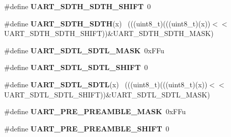 \begin{DoxyCompactItemize}
\item 
\hypertarget{group___u_a_r_t___register___masks_ga144b76c0d393075368118f122cf81fe1}{}\#define {\bfseries U\+A\+R\+T\+\_\+\+S\+D\+T\+H\+\_\+\+S\+D\+T\+H\+\_\+\+S\+H\+I\+F\+T}~0\label{group___u_a_r_t___register___masks_ga144b76c0d393075368118f122cf81fe1}

\item 
\hypertarget{group___u_a_r_t___register___masks_ga3f0c26be4aceb2a72ecb2219b3568dd2}{}\#define {\bfseries U\+A\+R\+T\+\_\+\+S\+D\+T\+H\+\_\+\+S\+D\+T\+H}(x)                                            ~(((uint8\+\_\+t)(((uint8\+\_\+t)(x))$<$$<$U\+A\+R\+T\+\_\+\+S\+D\+T\+H\+\_\+\+S\+D\+T\+H\+\_\+\+S\+H\+I\+F\+T))\&U\+A\+R\+T\+\_\+\+S\+D\+T\+H\+\_\+\+S\+D\+T\+H\+\_\+\+M\+A\+S\+K)\label{group___u_a_r_t___register___masks_ga3f0c26be4aceb2a72ecb2219b3568dd2}

\item 
\hypertarget{group___u_a_r_t___register___masks_ga5a82a3d52dcc80ce72cc969b1f773c1f}{}\#define {\bfseries U\+A\+R\+T\+\_\+\+S\+D\+T\+L\+\_\+\+S\+D\+T\+L\+\_\+\+M\+A\+S\+K}~0x\+F\+Fu\label{group___u_a_r_t___register___masks_ga5a82a3d52dcc80ce72cc969b1f773c1f}

\item 
\hypertarget{group___u_a_r_t___register___masks_gaabaa2b60c255d47c4c05d6057d2f7bbb}{}\#define {\bfseries U\+A\+R\+T\+\_\+\+S\+D\+T\+L\+\_\+\+S\+D\+T\+L\+\_\+\+S\+H\+I\+F\+T}~0\label{group___u_a_r_t___register___masks_gaabaa2b60c255d47c4c05d6057d2f7bbb}

\item 
\hypertarget{group___u_a_r_t___register___masks_ga0659310bc41259f4d71e5ea1a4f4e91c}{}\#define {\bfseries U\+A\+R\+T\+\_\+\+S\+D\+T\+L\+\_\+\+S\+D\+T\+L}(x)                                            ~(((uint8\+\_\+t)(((uint8\+\_\+t)(x))$<$$<$U\+A\+R\+T\+\_\+\+S\+D\+T\+L\+\_\+\+S\+D\+T\+L\+\_\+\+S\+H\+I\+F\+T))\&U\+A\+R\+T\+\_\+\+S\+D\+T\+L\+\_\+\+S\+D\+T\+L\+\_\+\+M\+A\+S\+K)\label{group___u_a_r_t___register___masks_ga0659310bc41259f4d71e5ea1a4f4e91c}

\item 
\hypertarget{group___u_a_r_t___register___masks_gaabd1835f55cce1d7be8e7eb71ef12c5f}{}\#define {\bfseries U\+A\+R\+T\+\_\+\+P\+R\+E\+\_\+\+P\+R\+E\+A\+M\+B\+L\+E\+\_\+\+M\+A\+S\+K}~0x\+F\+Fu\label{group___u_a_r_t___register___masks_gaabd1835f55cce1d7be8e7eb71ef12c5f}

\item 
\hypertarget{group___u_a_r_t___register___masks_ga538cbfb781ad5176edb1b02b0da06f7c}{}\#define {\bfseries U\+A\+R\+T\+\_\+\+P\+R\+E\+\_\+\+P\+R\+E\+A\+M\+B\+L\+E\+\_\+\+S\+H\+I\+F\+T}~0\label{group___u_a_r_t___register___masks_ga538cbfb781ad5176edb1b02b0da06f7c}


\end{DoxyCompactItemize}
